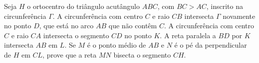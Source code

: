 Seja $H$ o ortocentro do triângulo acutângulo $ABC$, com $BC > AC$, inscrito na circunferência $\Gamma$.
A circunferência com centro $C$ e raio $CB$ intersecta $\Gamma$ novamente no ponto $D$, que está no arco $AB$ que não contêm $C$.
A circunferência com centro $C$ e raio $CA$ intersecta o segmento $CD$ no ponto $K$.
A reta paralela a $BD$ por $K$ intersecta $AB$ em $L$.
Se $M$ é o ponto médio de $AB$ e $N$ é o pé da perpendicular de $H$ em $CL$, prove que a reta $MN$ bisecta o segmento $CH$.
